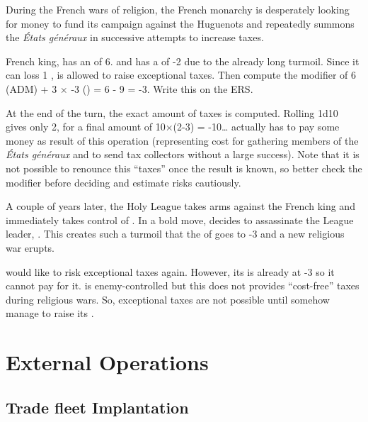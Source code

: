 \begin{exemple}
  During the French wars of religion, the French monarchy is desperately
  looking for money to fund its campaign against the Huguenots and repeatedly
  summons the \emph{États généraux} in successive attempts to increase taxes.

  French king,  has an \ADM of 6. and \FRA has a \STAB of
  -2 due to the already long turmoil. Since it can loss 1 \STAB, \FRA is
  allowed to raise exceptional taxes. Then compute the modifier of 6 (ADM) + 3
  $\times$ -3 (\STAB) = 6 - 9 = -3. Write this on the ERS.

  At the end of the turn, the exact amount of taxes is computed. Rolling 1d10
  gives only 2, for a final amount of 10$\times$(2-3) = -10\ducats\ldots \FRA
  actually has to pay some money as result of this operation (representing
  cost for gathering members of the \emph{États généraux} and to send tax
  collectors without a large success). Note that it is not possible to
  renounce this ``taxes'' once the result is known, so better check the
  modifier before deciding and estimate risks cautiously.

  \smallskip

  A couple of years later, the Holy League takes arms against the French king
  and immediately takes control of \villeParis. In a bold move,
   decides to assassinate the League leader,
  \leaderGuise. This creates such a turmoil that the \STAB of \FRA goes to -3
  and a new religious war erupts.

  \FRA would like to risk exceptional taxes again. However, its \STAB is
  already at -3 so it cannot pay for it. \villeParis is enemy-controlled but
  this does not provides ``cost-free'' taxes during religious wars. So,
  exceptional taxes are not possible until \FRA somehow manage to raise its
  \STAB.
\end{exemple}




\section{External Operations}



\subsection{Trade fleet Implantation}


